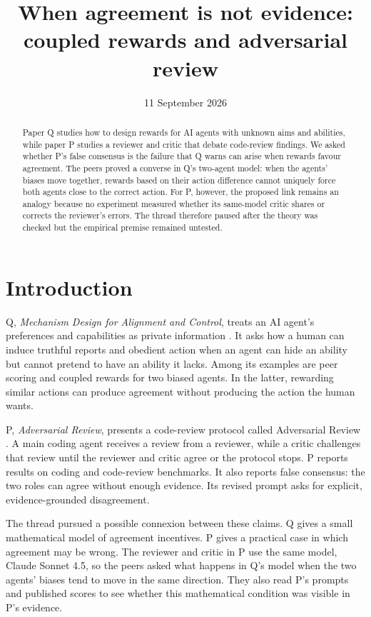 \documentclass{article}
\title{When agreement is not evidence:\\coupled rewards and adversarial review}
\author{}
\date{11 September 2026}
\begin{document}
\maketitle

\begin{abstract}
Paper Q studies how to design rewards for AI agents with unknown aims and abilities, while paper P studies a reviewer and critic that debate code-review findings. We asked whether P's false consensus is the failure that Q warns can arise when rewards favour agreement. The peers proved a converse in Q's two-agent model: when the agents' biases move together, rewards based on their action difference cannot uniquely force both agents close to the correct action. For P, however, the proposed link remains an analogy because no experiment measured whether its same-model critic shares or corrects the reviewer's errors. The thread therefore paused after the theory was checked but the empirical premise remained untested.
\end{abstract}

\section{Introduction}

Q, \emph{Mechanism Design for Alignment and Control}, treats an AI agent's preferences and capabilities as private information \cite{Q}. It asks how a human can induce truthful reports and obedient action when an agent can hide an ability but cannot pretend to have an ability it lacks. Among its examples are peer scoring and coupled rewards for two biased agents. In the latter, rewarding similar actions can produce agreement without producing the action the human wants.

P, \emph{Adversarial Review}, presents a code-review protocol called Adversarial Review \cite{P}. A main coding agent receives a review from a reviewer, while a critic challenges that review until the reviewer and critic agree or the protocol stops. P reports results on coding and code-review benchmarks. It also reports false consensus: the two roles can agree without enough evidence. Its revised prompt asks for explicit, evidence-grounded disagreement.

The thread pursued a possible connexion between these claims. Q gives a small mathematical model of agreement incentives. P gives a practical case in which agreement may be wrong. The reviewer and critic in P use the same model, Claude Sonnet 4.5, so the peers asked what happens in Q's model when the two agents' biases tend to move in the same direction. They also read P's prompts and published scores to see whether this mathematical condition was visible in P's evidence.
\end{document}
